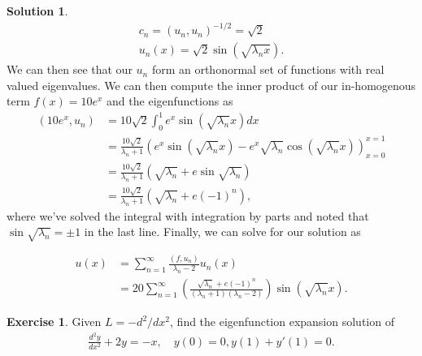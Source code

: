\documentclass[12pt]{article}
\theoremstyle{definition}
\newtheorem{exer}{Exercise}
\newtheorem{sol}{Solution}
\theoremstyle{remark}
\begin{document}
\begin{sol}
\begin{align*}
c_{n} = (u_{n}, u_{n})^{- 1 / 2} = \sqrt{2}\\
u_{n}(x) = \sqrt{2} \sin(\sqrt{\lambda_{n}x}).
\end{align*}
We can then see that our $u_{n}$ form an orthonormal set of functions with real valued eigenvalues. We can then compute the inner product of our in-homogenous term $f(x) = 10e^{x}$ and the eigenfunctions as 
\begin{align*}
    (10e^{x}, u_{n}) &= 10\sqrt{2}\int_{0}^{1} e^{x}\sin \left( \sqrt{\lambda_{n}} x \right)dx\\
                     &= \frac{10 \sqrt{2}}{\lambda_{n} + 1} \left(e^{x} \sin(\sqrt{\lambda_{n}}x) - e^{x}\sqrt{\lambda_{n}}\cos(\sqrt{\lambda_{n}}x)\right)_{x=0}^{x=1}\\
                     &= \frac{10 \sqrt{2}}{\lambda_{n} + 1} \left(\sqrt{\lambda_{n}} + e \sin\sqrt{\lambda_{n}} \right)\\
                     &= \frac{10 \sqrt{2}}{\lambda_{n} + 1} \left(\sqrt{\lambda_{n}} + e(-1)^{n} \right),
\end{align*}
where we've solved the integral with integration by parts and noted that $\sin \sqrt{\lambda_{n}} = \pm 1$ in the last line. Finally, we can solve for our solution as

\begin{align*}
    u(x) &= \sum_{n=1}^{\infty} \frac{(f, u_{n})}{\lambda_{n} - 2} u_{n}(x)\\
         &= 20\sum_{n=1}^{\infty} \left(\frac{\sqrt{\lambda_{n}} + e(-1)^{n}}{(\lambda_{n} + 1)(\lambda_{n} - 2)}\right)\sin(\sqrt{\lambda_{n}}x).
\end{align*}
\end{sol}

\newpage

\begin{exer}
    Given $L = - d^{2} / dx^{2}$, find the eigenfunction expansion solution of 
    \begin{align*}
        \frac{d^{2} y}{dx^{2}} + 2y = -x, \quad y(0) = 0, y(1) + y'(1) = 0.
    \end{align*}
\end{exer}
\end{document}
